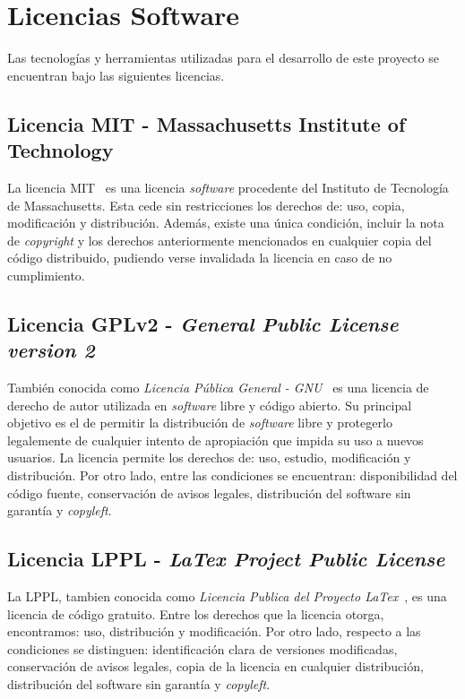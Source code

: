 \section{Licencias Software}

Las tecnologías y herramientas utilizadas para el desarrollo de este proyecto se encuentran bajo las siguientes licencias.

\subsection{Licencia MIT - Massachusetts Institute of Technology}

La licencia MIT~\cite{mit_license} es una licencia \textit{software} procedente del Instituto de Tecnología de Massachusetts. Esta cede sin restricciones los derechos de: uso, copia, modificación y distribución. Además, existe una única condición, incluir la nota de \textit{copyright} y los derechos anteriormente mencionados en cualquier copia del código distribuido, pudiendo verse invalidada la licencia en caso de no cumplimiento.

\subsection{Licencia GPLv2 - \textit{General Public License version 2}}

También conocida como \textit{Licencia Pública General - GNU}~\cite{gplv2_license} es una licencia de derecho de autor utilizada en \textit{software} libre y código abierto. Su principal objetivo es el de permitir la distribución de \textit{software} libre y protegerlo legalemente de cualquier intento de apropiación que impida su uso a nuevos usuarios. La licencia permite los derechos de: uso, estudio, modificación y distribución. Por otro lado, entre las condiciones se encuentran: disponibilidad del código fuente, conservación de avisos legales, distribución del software sin garantía y \textit{copyleft}.

\subsection{Licencia LPPL - \textit{LaTex Project Public License}}
La LPPL, tambien conocida como \textit{Licencia Publica del Proyecto LaTex}~\cite{latex_license}, es una licencia de código gratuito. Entre los derechos que la licencia otorga, encontramos: uso, distribución y modificación. Por otro lado, respecto a las condiciones se distinguen: identificación clara de versiones modificadas, conservación de avisos legales, copia de la licencia en cualquier distribución, distribución del software sin garantía y \textit{copyleft}.

